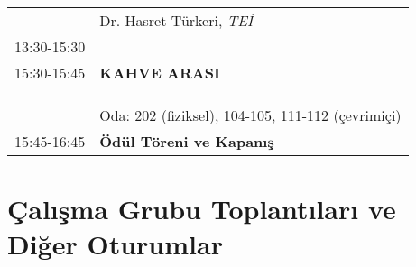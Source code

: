 \begin{table}[hbt!]
{\begin{tabular}{@{}ll@{}}
                              & Dr. Hasret Türkeri, \textit{TEİ}                                                   \\
\multirow{-9}{*}{13:30-15:30} &                                                                                    \\
\rowcolor[HTML]{C0C0C0} 
15:30-15:45                   & \textbf{KAHVE ARASI}                                                               \\
                              &                                                                                    \\
                              &                                                                                    \\
                              &                                                                                    \\
                              &Oda: 202 (fiziksel), 104-105, 111-112 (çevrimiçi)                                                                                      \\
\multirow{-5}{*}{15:45-16:45} &
  \multirow{-5}{*}{\textbf{Ödül Töreni ve Kapanış}} \\ \bottomrule
\end{tabular}%
}
\end{table}


\newpage
\section{Çalışma Grubu Toplantıları ve Diğer Oturumlar}

